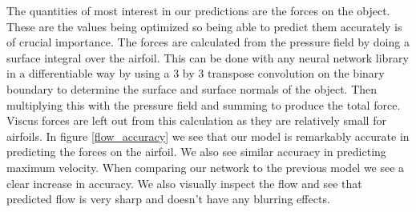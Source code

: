 \documentclass{article} %
\begin{document}
The quantities of most interest in our predictions are the forces on the object. These are the values being optimized so being able to predict them accurately is of crucial importance. The forces are calculated from the pressure field by doing a surface integral over the airfoil. This can be done with any neural network library in a differentiable way by using a 3 by 3 transpose convolution on the binary boundary to determine the surface and surface normals of the object. Then multiplying this with the pressure field and summing to produce the total force. Viscus forces are left out from this calculation as they are relatively small for airfoils. In figure \ref{flow_accuracy} we see that our model is remarkably accurate in predicting the forces on the airfoil. We also see similar accuracy in predicting maximum velocity. When comparing our network to the previous model we see a clear increase in accuracy. We also visually inspect the flow and see that predicted flow is very sharp and doesn't have any blurring effects.
\end{document}
